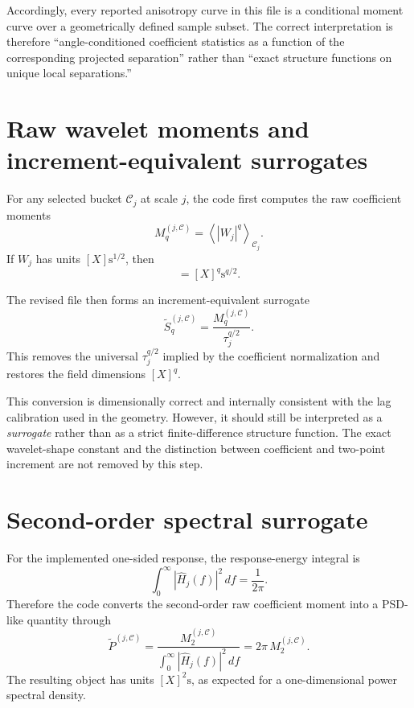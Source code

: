 \documentclass[11pt]{article}
\begin{document}
Accordingly, every reported anisotropy curve in this file is a conditional moment curve over a geometrically defined sample subset. The correct interpretation is therefore ``angle-conditioned coefficient statistics as a function of the corresponding projected separation'' rather than ``exact structure functions on unique local separations.''

\section{Raw wavelet moments and increment-equivalent surrogates}

For any selected bucket $\mathcal{C}_j$ at scale $j$, the code first computes the raw coefficient moments
\begin{equation}
 M_q^{(j,\mathcal{C})} = \left\langle |W_j|^q \right\rangle_{\mathcal{C}_j}.
\end{equation}
If $W_j$ has units $[X] \mathrm{s}^{1/2}$, then
\begin{equation}
 [M_q^{(j,\mathcal{C})}] = [X]^q \mathrm{s}^{q/2}.
\end{equation}

The revised file then forms an increment-equivalent surrogate
\begin{equation}
 \widetilde{S}_q^{(j,\mathcal{C})} = \frac{M_q^{(j,\mathcal{C})}}{\tau_j^{q/2}}.
\end{equation}
This removes the universal $\tau_j^{q/2}$ implied by the coefficient normalization and restores the field dimensions $[X]^q$.

This conversion is dimensionally correct and internally consistent with the lag calibration used in the geometry. However, it should still be interpreted as a \emph{surrogate} rather than as a strict finite-difference structure function. The exact wavelet-shape constant and the distinction between coefficient and two-point increment are not removed by this step.

\section{Second-order spectral surrogate}

For the implemented one-sided response, the response-energy integral is
\begin{equation}
 \int_0^{\infty} |\widehat{H}_j(f)|^2 \, df = \frac{1}{2\pi}.
\end{equation}
Therefore the code converts the second-order raw coefficient moment into a PSD-like quantity through
\begin{equation}
 \widetilde{P}^{(j,\mathcal{C})} = \frac{M_2^{(j,\mathcal{C})}}{\int_0^{\infty} |\widehat{H}_j(f)|^2 \, df} = 2\pi \, M_2^{(j,\mathcal{C})}.
\end{equation}
The resulting object has units $[X]^2 \mathrm{s}$, as expected for a one-dimensional power spectral density.
\end{document}

